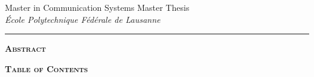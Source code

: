 {\noindent
  \large
  Master in Communication Systems \hfill Master Thesis\\
  \textit{École Polytechnique Fédérale de Lausanne}
  \hfill
  \textsc{\theauthor}}

\vspace{4em}

\begin{center}{\LARGE \textbf{\thetitle}}

  \vspace{1.1em}
  \rule{4em}{.1pt}
  \vspace{1.4em}

  \thecredits
\end{center}

\vspace{1.3em}

\begin{center}
  \parbox{0.84\linewidth}{
    \setlength{\parindent}{11.1pt}
    \noindent
    \textsc{\textbf{Abstract}}\\

    \theabstract
  }
\end{center}

\vspace{1.3em}

\begin{center}
  \parbox{0.84\linewidth}{
    \setlength{\parindent}{11.1pt}
    \noindent
    \setcounter{tocdepth}{2}
    \hypersetup{linkcolor=black}
    \textsc{\textbf{Table of Contents}}

    \vspace{-4em}
    \renewcommand\contentsname{}
    \tableofcontents}
\end{center}

\newpage
{}
\restoregeometry